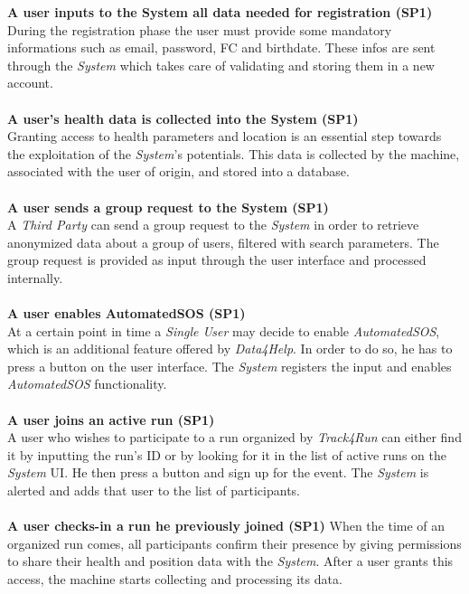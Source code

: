 \documentclass[titlepage]{article}
\begin{document}
	{\bf A user inputs to the System all data needed for registration (SP1)} \\
	During the registration phase the user must provide some mandatory informations such as email, password, FC and 	birthdate. These infos are sent through the {\it System} which takes care of validating and storing them in a new 		account.\\ \\
	{\bf A user’s health data is collected into the System (SP1)} \\
	Granting access to health parameters and location is an essential step towards the exploitation of the {\it System}’s 		potentials. This data is collected by the machine, associated with the user of origin, and stored into a database.\\ \\
	{\bf A user sends a group request to the System (SP1)} \\
	A {\it Third Party} can send a group request to the {\it System} in order to retrieve anonymized data about a group of 		users, filtered with search parameters. The group request is provided as input through the user interface and processed 	internally.\\ \\
	{\bf A user enables AutomatedSOS (SP1)} \\
	At a certain point in time a {\it Single User} may decide to enable {\it AutomatedSOS}, which is an additional feature 		offered by {\it Data4Help}. In order to do so, he has to press a button on the user interface. The {\it System} registers 	the input and enables {\it AutomatedSOS} functionality.\\ \\
	{\bf A user joins an active run (SP1)} \\
	A user who wishes  to participate to a run organized by {\it Track4Run} can either find it by inputting the run’s ID or by 	looking for it in the list of active runs on the {\it System} UI. He then press a button and sign up for the event. The {\it 	System} is alerted and adds that user to the list of participants. \\ \\
{\bf A user checks-in a run he previously joined (SP1)}
When the time of an organized run comes, all participants confirm their presence by giving permissions to share their health and position data with the {\it System}. After a user grants this access, the machine starts collecting and processing its data.\\ \\
\end{document}
